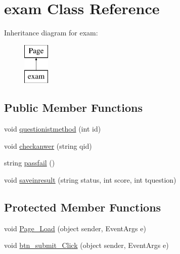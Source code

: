 \hypertarget{classexam}{}\section{exam Class Reference}
\label{classexam}
Inheritance diagram for exam\+:\begin{figure}[H]
\begin{center}
\leavevmode
\includegraphics[height=2.000000cm]{classexam}
\end{center}
\end{figure}
\subsection*{Public Member Functions}
\begin{DoxyCompactItemize}
\item 
void \mbox{\hyperlink{classexam_a96a0b830b92f813a018d477f7a61cd4c}{questionistmethod}} (int id)
\item 
void \mbox{\hyperlink{classexam_a9cc83bde64452d20aa1259108a9c33a4}{checkanwer}} (string qid)
\item 
string \mbox{\hyperlink{classexam_a5b56f8b01e90cf29047762ac58140786}{passfail}} ()
\item 
void \mbox{\hyperlink{classexam_a9d93630c053d5c62248a0f4361d585da}{saveinresult}} (string status, int score, int tquestion)
\end{DoxyCompactItemize}
\subsection*{Protected Member Functions}
\begin{DoxyCompactItemize}
\item 
void \mbox{\hyperlink{classexam_ab1ee701afa79751475c4e5f52c417f0b}{Page\+\_\+\+Load}} (object sender, Event\+Args e)
\item 
void \mbox{\hyperlink{classexam_a63572b6a596a0ee29ff9482c7b737d12}{btn\+\_\+submit\+\_\+\+Click}} (object sender, Event\+Args e)
\end{DoxyCompactItemize}
